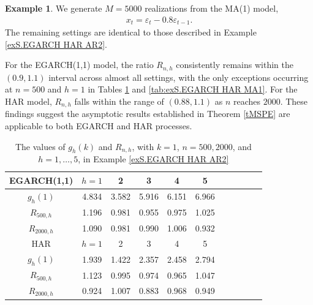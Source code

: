 \documentclass[ejsv2]{imsart}
\theoremstyle{plain}
\theoremstyle{definition}
\newtheorem{example}{Example}[section]
\theoremstyle{remark}
\begin{document}
\begin{example}\label{exS.EGARCH HAR MA1}
We generate $M=5000$ realizations from
the MA(1) model,
\begin{eqnarray*}
x_t=\varepsilon_t-0.8\varepsilon_{t-1}.
\end{eqnarray*}
The remaining settings are identical to those described in Example \ref{exS.EGARCH HAR AR2}. 
\end{example}

For the EGARCH(1,1) model, the ratio $R_{n,h}$ consistently remains within the $(0.9, 1.1)$ interval across almost all settings, with the only exceptions occurring at $n=500$ and $h=1$ in Tables \ref{tab:exS.EGARCH HAR AR2} and \ref{tab:exS.EGARCH HAR MA1}. For the HAR model, $R_{n,h}$ falls within the range of $(0.88, 1.1)$ as $n$ reaches $2000$.  These findings suggest the asymptotic results established in Theorem \ref{tMSPE} are applicable to both EGARCH and HAR processes.

\begin{table}
\caption{The values of $g_{h}(k)$ and $R_{n,h}$, with $k=1$, $n=500, 2000$, and $h=1,\ldots, 5$, in Example \ref{exS.EGARCH HAR AR2}}
\label{tab:exS.EGARCH HAR AR2}
\centering
\begin{tabular}{ccccccccccc} \hline
    EGARCH(1,1) & $h=1$ & 2 & 3 & 4 & 5 \\ \hline
    $g_{h}(1)$ & 4.834 & 3.582 & 5.916 & 6.151 & 6.966 \\ \hline
   $R_{500,h}$ & 1.196 & 0.981 & 0.955 & 0.975 & 1.025 \\
   $R_{2000,h}$ & 1.090 & 0.981 & 0.990 & 1.006 & 0.932 \\ \hline \hline
   HAR & $h=1$ & 2 & 3 & 4 & 5 \\ \hline
    $g_{h}(1)$ & 1.939 & 1.422 & 2.357 & 2.458 & 2.794 \\ \hline
   $R_{500,h}$ & 1.123 & 0.995 & 0.974 & 0.965 & 1.047 \\
   $R_{2000,h}$ & 0.924 & 1.007 & 0.883 & 0.968 & 0.949 \\ \hline
  \end{tabular}
\end{table}
\end{document}

